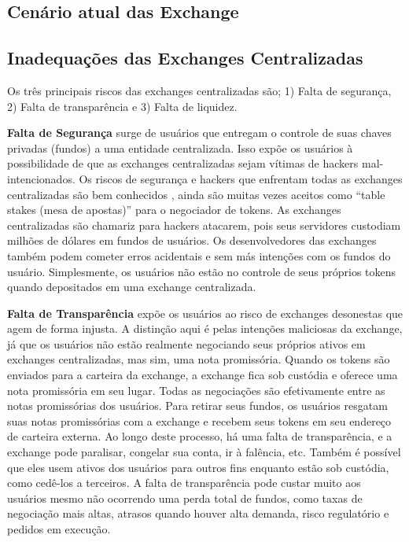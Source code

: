 \documentclass[UTF8,nofonts]{article}
\begin{document}
\begin{multicols}{2}
\section{Cenário atual das Exchange\label{sec:current_exchange_landscape}}

\subsection{Inadequações das Exchanges Centralizadas}
Os três principais riscos das exchanges centralizadas são; 1) Falta de segurança, 2) Falta de transparência e 3) Falta de liquidez.

\textbf{Falta de Segurança} surge de usuários que entregam o controle de suas chaves privadas (fundos) a uma entidade centralizada. Isso expõe os usuários à possibilidade de que as exchanges centralizadas sejam vítimas de hackers mal-intencionados. Os riscos de segurança e hackers que enfrentam todas as exchanges centralizadas são bem conhecidos \cite{coincheckhack}  \cite{mcmillan2014inside}, ainda são muitas vezes aceitos como \enquote{table stakes (mesa de apostas)} para o negociador de tokens. As exchanges centralizadas são chamariz para hackers atacarem, pois seus servidores custodiam milhões de dólares em fundos de usuários. Os desenvolvedores das exchanges também podem cometer erros acidentais e sem más intenções com os fundos do usuário. Simplesmente, os usuários não estão no controle de seus próprios tokens quando depositados em uma exchange centralizada.

\textbf{Falta de Transparência} expõe os usuários ao risco de exchanges desonestas que agem de forma injusta. A distinção aqui é pelas intenções maliciosas da exchange, já que os usuários não estão realmente negociando seus próprios ativos em exchanges centralizadas, mas sim, uma nota promissória. Quando os tokens são enviados para a carteira da exchange, a exchange fica sob custódia e oferece uma nota promissória em seu lugar. Todas as negociações são efetivamente entre as notas promissórias dos usuários. Para retirar seus fundos, os usuários resgatam suas notas promissórias com a exchange e recebem seus tokens em seu endereço de carteira externa. Ao longo deste processo, há uma falta de transparência, e a exchange pode paralisar, congelar sua conta, ir à falência, etc. Também é possível que eles usem ativos dos usuários para outros fins enquanto estão sob custódia, como cedê-los a terceiros. A falta de transparência pode custar muito aos usuários mesmo não ocorrendo uma perda total de fundos, como taxas de negociação mais altas, atrasos quando houver alta demanda, risco regulatório e pedidos em execução.


\end{multicols}
\end{document}
